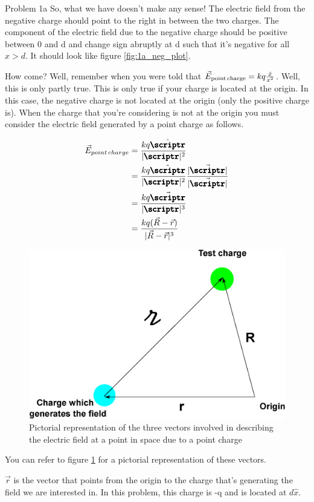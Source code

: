\begin{homeworkProblem}
\begin{homeworkSection}{Problem 1a}
So, what we have doesn't make any sense! The electric field from the negative charge should point to the right in between the two charges. The component of the electric field due to the negative charge should be positive between 0 and d and change sign abruptly at d such that it's negative for all $x >d$. It should look like figure \ref{fig:1a_neg_plot}.


How come? Well, remember when you were told that $\vec{E}_{\text{point\,charge}} = k q\frac{\hat{x}}{x^2}$. Well, this is only partly true. This is only true if your charge is located at the origin. In this case, the negative charge is not located at the origin (only the positive charge is). When the charge that you're considering is not at the origin you must consider the electric field generated by a point charge as follows.

\begin{align}
\vec{E}_{point\,charge} &= \frac{k q \hat{\pmb{\scriptr}}}{|\pmb{\scriptr}|^2} \nonumber \\
												&= \frac{k q \hat{\pmb{\scriptr}}}{|\pmb{\scriptr}|^2}\frac{|\vec{\pmb{\scriptr}}|}{|\vec{\pmb{\scriptr}}|} \nonumber \\
												&= \frac{k q \vec{\pmb{\scriptr}}}{|\pmb{\scriptr}|^3} \nonumber \\
												&=  \frac{k q ( \vec{R} - \vec{r} )}{|\vec{R}-\vec{r}|^3} \nonumber
\end{align}

\begin{figure}%
\centering
\includegraphics[width=.5\columnwidth]{1a_vec.eps}%
\caption{Pictorial representation of the three vectors involved in describing the electric field at a point in space due to a point charge}%
\label{fig:1a_vec}%
\end{figure}

You can refer to figure \ref{fig:1a_vec} for a pictorial representation of these vectors.

$\vec{r}$ is the vector that points from the origin to the charge that's generating the field we are interested in. In this problem, this charge is -q and is located at $d \hat{x}$.


\end{homeworkSection}
\end{homeworkProblem}
